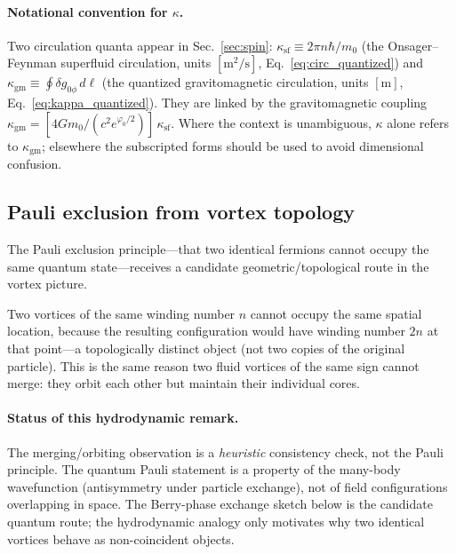 \documentclass[aps,prd,onecolumn,superscriptaddress,nofootinbib,showpacs,12pt,notitlepage]{revtex4-2}
\begin{document}
\paragraph{Notational convention for $\kappa$.}
Two circulation quanta appear in Sec.~\ref{sec:spin}:
$\kappa_{\mathrm{sf}} \equiv 2\pi n\hbar/m_{0}$
(the Onsager--Feynman superfluid circulation, units
$[\mathrm m^{2}/\mathrm s]$, Eq.~\ref{eq:circ_quantized})
and $\kappa_{\mathrm{gm}}\equiv\oint\delta g_{0\phi}\,d\ell$
(the quantized gravitomagnetic circulation, units
$[\mathrm m]$, Eq.~\ref{eq:kappa_quantized}).  They are
linked by the gravitomagnetic coupling
$\kappa_{\mathrm{gm}} = [4Gm_{0}/(c^{2}e^{\varphi_{0}/2})]\,
\kappa_{\mathrm{sf}}$.  Where the context is
unambiguous, $\kappa$ alone refers to
$\kappa_{\mathrm{gm}}$; elsewhere the subscripted forms
should be used to avoid dimensional confusion.

\subsection{Pauli exclusion from vortex topology}
\label{sec:pauli}

The Pauli exclusion principle---that two identical fermions
cannot occupy the same quantum state---receives a candidate
geometric/topological route in the vortex picture.

Two vortices of the same winding number $n$ cannot occupy
the same spatial location, because the resulting configuration
would have winding number $2n$ at that point---a topologically
distinct object (not two copies of the original particle).
This is the same reason two fluid vortices of the same sign
cannot merge: they orbit each other but maintain their
individual cores.

\paragraph{Status of this hydrodynamic remark.}
The merging/orbiting observation is a
\emph{heuristic} consistency check, not the Pauli
principle.  The quantum Pauli statement is a property of
the many-body wavefunction (antisymmetry under particle
exchange), not of field configurations overlapping in
space.  The Berry-phase exchange sketch below is the
candidate quantum route; the hydrodynamic analogy only
motivates why two identical vortices behave as
non-coincident objects.
\end{document}
